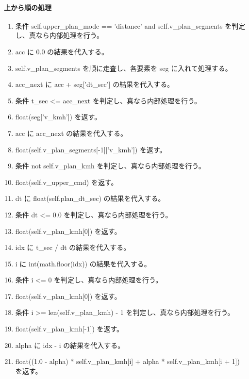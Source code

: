 \documentclass[a4paper,11pt]{article}
\begin{document}
            \paragraph{上から順の処理}
            \begin{enumerate}[leftmargin=1.8em]
            \item 条件 self.upper\_plan\_mode == 'distance' and self.v\_plan\_segments を判定し、真なら内部処理を行う。
\item   acc に 0.0 の結果を代入する。
\item   self.v\_plan\_segments を順に走査し、各要素を seg に入れて処理する。
\item     acc\_next に acc + seg['dt\_sec'] の結果を代入する。
\item     条件 t\_sec <= acc\_next を判定し、真なら内部処理を行う。
\item       float(seg['v\_kmh']) を返す。
\item     acc に acc\_next の結果を代入する。
\item   float(self.v\_plan\_segments[-1]['v\_kmh']) を返す。
\item 条件 not self.v\_plan\_kmh を判定し、真なら内部処理を行う。
\item   float(self.v\_upper\_cmd) を返す。
\item dt に float(self.plan\_dt\_sec) の結果を代入する。
\item 条件 dt <= 0.0 を判定し、真なら内部処理を行う。
\item   float(self.v\_plan\_kmh[0]) を返す。
\item idx に t\_sec / dt の結果を代入する。
\item i に int(math.floor(idx)) の結果を代入する。
\item 条件 i <= 0 を判定し、真なら内部処理を行う。
\item   float(self.v\_plan\_kmh[0]) を返す。
\item 条件 i >= len(self.v\_plan\_kmh) - 1 を判定し、真なら内部処理を行う。
\item   float(self.v\_plan\_kmh[-1]) を返す。
\item alpha に idx - i の結果を代入する。
\item float((1.0 - alpha) * self.v\_plan\_kmh[i] + alpha * self.v\_plan\_kmh[i + 1]) を返す。
            \end{enumerate}
\end{document}
